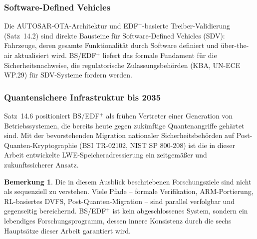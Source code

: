 ﻿\documentclass[a4paper,12pt]{scrreprt}
\theoremstyle{definition}
\newtheorem{bemerkung}{Bemerkung}[chapter]
\begin{document}
	\subsubsection{Software-Defined Vehicles}
	
	Die AUTOSAR-OTA-Architektur \cite{Epp2026autsre} und 
	EDF$^+$-basierte Treiber-Validierung (Satz~14.2) sind direkte
	Bausteine für Software-Defined Vehicles (SDV): Fahrzeuge, deren
	gesamte Funktionalität durch Software definiert und über-the-air
	aktualisiert wird. BS/EDF$^+$ liefert das formale Fundament für
	die Sicherheitsnachweise, die regulatorische Zulassungsbehörden
	(KBA, UN-ECE WP.29) für SDV-Systeme fordern werden.
	
	\subsubsection{Quantensichere Infrastruktur bis 2035}
	
	Satz~14.6 positioniert BS/EDF$^+$ als frühen Vertreter
	einer Generation von Betriebssystemen, die bereits heute
	gegen zukünftige Quantenangriffe gehärtet sind. Mit der
	bevorstehenden Migration nationaler Sicherheitsbehörden
	auf Post-Quanten-Kryptographie (BSI TR-02102, NIST SP 800-208)
	ist die in dieser Arbeit entwickelte LWE-Speicheradressierung
	ein zeitgemäßer und zukunftssicherer Ansatz.
	
	\begin{bemerkung}
		Die in diesem Ausblick beschriebenen Forschungsziele sind nicht
		als sequenziell zu verstehen. Viele Pfade -- formale Verifikation,
		ARM-Portierung, RL-basiertes DVFS, Post-Quanten-Migration --
		sind parallel verfolgbar und gegenseitig bereichernd.
		BS/EDF$^+$ ist kein abgeschlossenes System, sondern ein
		lebendiges Forschungsprogramm, dessen innere Konsistenz durch
		die sechs Hauptsätze dieser Arbeit garantiert wird.
	\end{bemerkung}
	
\end{document}
